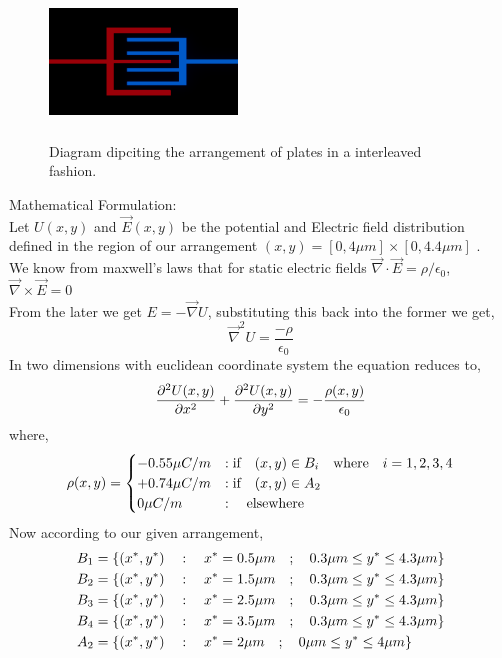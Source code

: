 \begin{figure}[h]
    \centering
    \includegraphics[width=5cm, height=4cm]{content/interleaved_cap_2D.png}
    \caption{\small Diagram dipciting the arrangement of plates in a interleaved fashion.}
    \label{fig 1: the capacitor}
\end{figure}
Mathematical Formulation:\\
Let $U(x,y)$ and $\vec{E}(x,y)$ be the potential and Electric field distribution defined in the region of our arrangement $(x,y) = [0,4\mu m]\times[0,4.4\mu m]$ .\\
We know from maxwell's laws that for static electric fields $\vec{\nabla} \cdot \vec{E} = \rho / \epsilon_0 $, $\vec{\nabla} \times \vec{E} = 0$
\\
From the later we get $E=-\vec{\nabla}U$, substituting this back into the former we get,
\begin{equation*}
    \vec{\nabla}^2 U = \frac{-\rho}{\epsilon_0}  
\end{equation*}
In two dimensions with euclidean coordinate system the equation reduces to, 
\begin{equation}
    \frac{\partial^2U(x,y) }{\partial x^{2}} + \frac{\partial^2U(x,y) }{\partial y^{2}}= -\frac{\rho(x,y)}{\epsilon_0} \\
\end{equation}
where,
\begin{equation}
\rho(x,y) =  \begin{cases}
    -0.55 \mu C/m & :\text{if} \hspace{0.35cm} (x,y) \in B_i \hspace{0.35cm} \text{where} \hspace{0.35cm} i = 1,2,3,4 \\
    +0.74 \mu C/m & :\text{if} \hspace{0.35cm} (x,y) \in A_2  \\
    0 \mu C/m & : \hspace{0.35cm} \text{elsewhere} \\
\end{cases}  
\end{equation}
Now according to our given arrangement,
\begin{align}
    B_1 &= \{ (x^*,y^*) \hspace{0.35cm} : \hspace{0.35cm} x^*= 0.5\mu m \hspace{0.35cm};\hspace{0.35cm} 0.3\mu m \leq y^* \leq 4.3\mu m \} \\
    B_2 &= \{ (x^*,y^*) \hspace{0.35cm} : \hspace{0.35cm} x^*= 1.5\mu m \hspace{0.35cm};\hspace{0.35cm} 0.3\mu m \leq y^* \leq 4.3\mu m \} \\
    B_3 &= \{ (x^*,y^*) \hspace{0.35cm} : \hspace{0.35cm} x^*= 2.5\mu m \hspace{0.35cm};\hspace{0.35cm} 0.3\mu m \leq y^* \leq 4.3\mu m \} \\
    B_4 &= \{ (x^*,y^*) \hspace{0.35cm} : \hspace{0.35cm} x^*= 3.5\mu m \hspace{0.35cm};\hspace{0.35cm} 0.3\mu m \leq y^* \leq 4.3\mu m \} \\
    A_2 &= \{ (x^*,y^*) \hspace{0.35cm} : \hspace{0.35cm} x^*= 2\mu m \hspace{0.35cm};\hspace{0.35cm} 0\mu m \leq y^* \leq 4\mu m \} 
\end{align}
